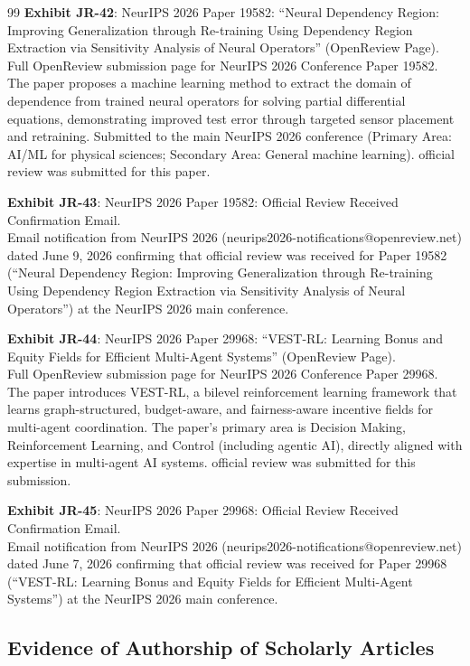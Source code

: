 \documentclass[11pt]{article}
\begin{document}
\begin{thebibliography}{99}
\textbf{Exhibit JR-42}: NeurIPS 2026 Paper 19582: ``Neural Dependency Region: Improving Generalization through Re-training Using Dependency Region Extraction via Sensitivity Analysis of Neural Operators'' (OpenReview Page).
\\Full OpenReview submission page for NeurIPS 2026 Conference Paper 19582. The paper proposes a machine learning method to extract the domain of dependence from trained neural operators for solving partial differential equations, demonstrating improved test error through targeted sensor placement and retraining. Submitted to the main NeurIPS 2026 conference (Primary Area: AI/ML for physical sciences; Secondary Area: General machine learning). \drs official review was submitted for this paper.

\textbf{Exhibit JR-43}: NeurIPS 2026 Paper 19582: Official Review Received Confirmation Email.
\\Email notification from NeurIPS 2026 (neurips2026-notifications@openreview.net) dated June 9, 2026 confirming that \drs official review was received for Paper 19582 (``Neural Dependency Region: Improving Generalization through Re-training Using Dependency Region Extraction via Sensitivity Analysis of Neural Operators'') at the NeurIPS 2026 main conference.

\textbf{Exhibit JR-44}: NeurIPS 2026 Paper 29968: ``VEST-RL: Learning Bonus and Equity Fields for Efficient Multi-Agent Systems'' (OpenReview Page).
\\Full OpenReview submission page for NeurIPS 2026 Conference Paper 29968. The paper introduces VEST-RL, a bilevel reinforcement learning framework that learns graph-structured, budget-aware, and fairness-aware incentive fields for multi-agent coordination. The paper's primary area is Decision Making, Reinforcement Learning, and Control (including agentic AI), directly aligned with \drs expertise in multi-agent AI systems. \drs official review was submitted for this submission.

\textbf{Exhibit JR-45}: NeurIPS 2026 Paper 29968: Official Review Received Confirmation Email.
\\Email notification from NeurIPS 2026 (neurips2026-notifications@openreview.net) dated June 7, 2026 confirming that \drs official review was received for Paper 29968 (``VEST-RL: Learning Bonus and Equity Fields for Efficient Multi-Agent Systems'') at the NeurIPS 2026 main conference.

\subsection*{Evidence of Authorship of Scholarly Articles}


\end{thebibliography}
\end{document}
